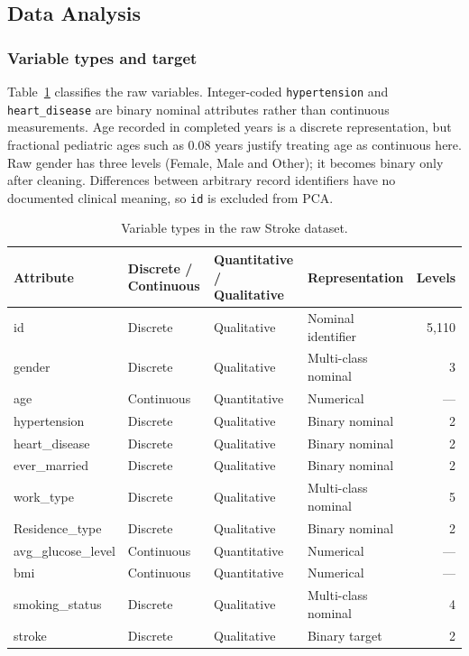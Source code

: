 \documentclass[12pt, a4paper]{article}
\begin{document}
\subsection{Data Analysis}
\subsubsection{Variable types and target}
Table~\ref{tab:stroke-types} classifies the raw variables. Integer-coded \texttt{hypertension} and \texttt{heart\_disease} are binary nominal attributes rather than continuous measurements. Age recorded in completed years is a discrete representation, but fractional pediatric ages such as 0.08 years justify treating age as continuous here. Raw gender has three levels (Female, Male and Other); it becomes binary only after cleaning. Differences between arbitrary record identifiers have no documented clinical meaning, so \texttt{id} is excluded from PCA.
\begin{table}[htbp]
\centering\small
\setlength{\tabcolsep}{4pt}\renewcommand{\arraystretch}{1.12}
\caption{Variable types in the raw Stroke dataset.}
\label{tab:stroke-types}
\begin{tabular}{p{.25\linewidth}p{.14\linewidth}p{.17\linewidth}p{.24\linewidth}r}
\toprule
\raggedright \textbf{Attribute} & \raggedright \textbf{Discrete / Continuous} & \raggedright \textbf{Quantitative / Qualitative} & \raggedright \textbf{Representation} & \textbf{Levels} \tabularnewline
\midrule
\raggedright id & \raggedright Discrete & \raggedright Qualitative & \raggedright Nominal identifier & 5,110 \tabularnewline
\raggedright gender & \raggedright Discrete & \raggedright Qualitative & \raggedright Multi-class nominal & 3 \tabularnewline
\raggedright age & \raggedright Continuous & \raggedright Quantitative & \raggedright Numerical & --- \tabularnewline
\raggedright hypertension & \raggedright Discrete & \raggedright Qualitative & \raggedright Binary nominal & 2 \tabularnewline
\raggedright heart\_disease & \raggedright Discrete & \raggedright Qualitative & \raggedright Binary nominal & 2 \tabularnewline
\raggedright ever\_married & \raggedright Discrete & \raggedright Qualitative & \raggedright Binary nominal & 2 \tabularnewline
\raggedright work\_type & \raggedright Discrete & \raggedright Qualitative & \raggedright Multi-class nominal & 5 \tabularnewline
\raggedright Residence\_type & \raggedright Discrete & \raggedright Qualitative & \raggedright Binary nominal & 2 \tabularnewline
\raggedright avg\_glucose\_level & \raggedright Continuous & \raggedright Quantitative & \raggedright Numerical & --- \tabularnewline
\raggedright bmi & \raggedright Continuous & \raggedright Quantitative & \raggedright Numerical & --- \tabularnewline
\raggedright smoking\_status & \raggedright Discrete & \raggedright Qualitative & \raggedright Multi-class nominal & 4 \tabularnewline
\raggedright stroke & \raggedright Discrete & \raggedright Qualitative & \raggedright Binary target & 2 \tabularnewline
\bottomrule
\end{tabular}
\end{table}
\end{document}
